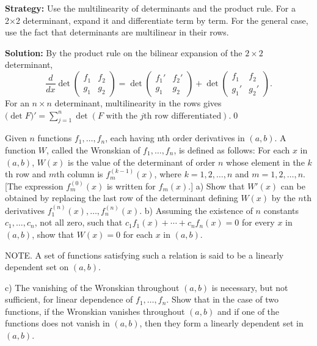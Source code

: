 \noindent\textbf{Strategy:} Use the multilinearity of determinants and the product rule. For a 2×2 determinant, expand it and differentiate term by term. For the general case, use the fact that determinants are multilinear in their rows.

\bigskip\noindent\textbf{Solution:}
By the product rule on the bilinear expansion of the $2\times2$ determinant,
\[\frac{d}{dx}\det\begin{pmatrix}f_1&f_2\\ g_1&g_2\end{pmatrix}=\det\begin{pmatrix}f_1'&f_2'\\ g_1&g_2\end{pmatrix}+\det\begin{pmatrix}f_1&f_2\\ g_1'&g_2'\end{pmatrix}.\]
For an $n\times n$ determinant, multilinearity in the rows gives $\big(\det F\big)'=\sum_{j=1}^{n}\det(F\text{ with the $j$th row differentiated}).$\qed


\begin{problembox}
Given \( n \) functions \( f_1, \ldots, f_n \), each having nth order derivatives in \( (a, b) \). A function \( W \), called the Wronskian of \( f_1, \ldots, f_n \), is defined as follows: For each \( x \) in \( (a, b) \), \( W(x) \) is the value of the determinant of order \( n \) whose element in the \( k \)th row and \( m \)th column is \( f_m^{(k-1)}(x) \), where \( k = 1, 2, \ldots, n \) and \( m = 1, 2, \ldots, n \). [The expression \( f_m^{(0)}(x) \) is written for \( f_m(x) \).]
a) Show that \( W'(x) \) can be obtained by replacing the last row of the determinant defining \( W(x) \) by the \( n \)th derivatives \( f_1^{(n)}(x), \ldots, f_n^{(n)}(x) \).
b) Assuming the existence of \( n \) constants \( c_1, \ldots, c_n \), not all zero, such that \( c_1 f_1(x) + \cdots + c_n f_n(x) = 0 \) for every \( x \) in \( (a, b) \), show that \( W(x) = 0 \) for each \( x \) in \( (a, b) \).

NOTE. A set of functions satisfying such a relation is said to be a linearly dependent set on \( (a, b) \).

c) The vanishing of the Wronskian throughout \( (a, b) \) is necessary, but not sufficient, for linear dependence of \( f_1, \ldots, f_n \). Show that in the case of two functions, if the Wronskian vanishes throughout \( (a, b) \) and if one of the functions does not vanish in \( (a, b) \), then they form a linearly dependent set in \( (a, b) \).
\end{problembox}

